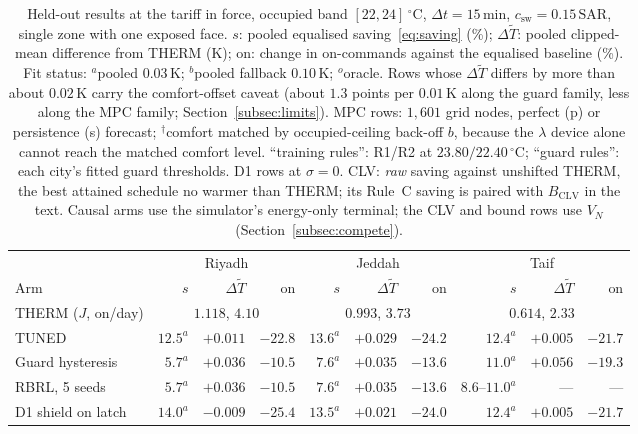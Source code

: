 \documentclass[pdflatex,sn-mathphys-num,iicol]{sn-jnl}
\theoremstyle{thmstyleone}\newtheorem{proposition}{Proposition}\newtheorem{corollary}{Corollary}
\theoremstyle{thmstyletwo}\newtheorem{remark}{Remark}\newtheorem{observation}{Observation}
\theoremstyle{thmstylethree}\newtheorem{definition}{Definition}
\newcommand{\csw}{c_{\mathrm{sw}}}
\newcommand{\SAR}{\text{SAR}}
\begin{document}
\begin{table}[t]
\centering
\caption{Held-out results at the tariff in force, occupied band
$[22,24]\,^\circ$C, $\Delta t=15\,$min, $\csw=0.15\,\SAR$, single zone with
one exposed face. $s$: pooled equalised saving~\eqref{eq:saving} (\%);
$\Delta\tilde T$: pooled clipped-mean difference from THERM (K); on: change
in on-commands against the equalised baseline (\%). Fit status:
$^{a}$pooled $0.03\,$K; $^{b}$pooled fallback $0.10\,$K; $^{o}$oracle. Rows
whose $\Delta\tilde T$ differs by more than about $0.02\,$K carry the
comfort-offset caveat (about $1.3$ points per $0.01\,$K along the guard
family, less along the MPC family; Section~\ref{subsec:limits}). MPC rows: $1{,}601$ grid nodes, perfect (p) or
persistence (s) forecast; $^{\dagger}$comfort matched by occupied-ceiling
back-off $b$, because the $\lambda$ device alone cannot reach the matched
comfort level. ``training rules'': R1/R2 at $23.80/22.40\,^\circ$C; ``guard
rules'': each city's fitted guard thresholds. D1 rows at $\sigma=0$. CLV:
\emph{raw} saving against unshifted THERM, the best attained schedule no
warmer than THERM; its Rule~C saving is paired with $B_{\mathrm{CLV}}$ in the
text. Causal arms use the simulator's energy-only terminal; the CLV and bound
rows use $V_N$ (Section~\ref{subsec:compete}).}
\label{tab:main}
\setlength{\tabcolsep}{1.5pt}
\footnotesize
\begin{tabular*}{\textwidth}{@{\extracolsep{\fill}}lrrrrrrrrr@{}}
\toprule
 & \multicolumn{3}{c}{Riyadh} & \multicolumn{3}{c}{Jeddah} & \multicolumn{3}{c}{Taif} \\
\cmidrule(lr){2-4}\cmidrule(lr){5-7}\cmidrule(lr){8-10}
Arm & $s$ & $\Delta\tilde T$ & on & $s$ & $\Delta\tilde T$ & on & $s$ & $\Delta\tilde T$ & on \\
\midrule
THERM ($J$, on/day) & \multicolumn{3}{c}{$1.118$, $4.10$} & \multicolumn{3}{c}{$0.993$, $3.73$} & \multicolumn{3}{c}{$0.614$, $2.33$} \\
TUNED & $12.5^{a}$ & $+0.011$ & $-22.8$ & $13.6^{a}$ & $+0.029$ & $-24.2$ & $12.4^{a}$ & $+0.005$ & $-21.7$ \\
Guard hysteresis & $5.7^{a}$ & $+0.036$ & $-10.5$ & $7.6^{a}$ & $+0.035$ & $-13.6$ & $11.0^{a}$ & $+0.056$ & $-19.3$ \\
RBRL, 5 seeds & $5.7^{a}$ & $+0.036$ & $-10.5$ & $7.6^{a}$ & $+0.035$ & $-13.6$ & $8.6$--$11.0^{a}$ & --- & --- \\
D1 shield on latch & $14.0^{a}$ & $-0.009$ & $-25.4$ & $13.5^{a}$ & $+0.021$ & $-24.0$ & $12.4^{a}$ & $+0.005$ & $-21.7$ \\

\end{tabular*}
\end{table}
\end{document}

